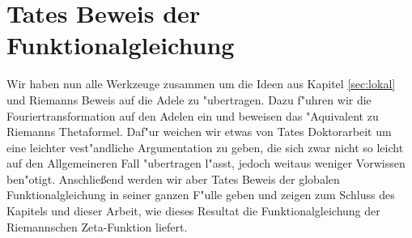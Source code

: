\section{Tates Beweis der Funktionalgleichung}\label{sec:tateproof}
	Wir haben nun alle Werkzeuge zusammen um die Ideen aus Kapitel \ref{sec:lokal} und Riemanns Beweis auf die Adele zu "ubertragen.
	Dazu f"uhren wir die Fouriertransformation auf den Adelen ein und beweisen das "Aquivalent zu Riemanns Thetaformel.
	Daf"ur weichen wir etwas von Tates Doktorarbeit um eine leichter vest"andliche Argumentation zu geben, die sich zwar nicht so leicht auf den Allgemeineren Fall "ubertragen l"asst, jedoch weitaus weniger Vorwissen ben"otigt.
	Anschließend werden wir aber Tates Beweis der globalen Funktionalgleichung in seiner ganzen F"ulle geben und zeigen zum Schluss des Kapitels und dieser Arbeit, wie dieses Resultat die Funktionalgleichung der Riemannschen Zeta-Funktion liefert.
	
	
